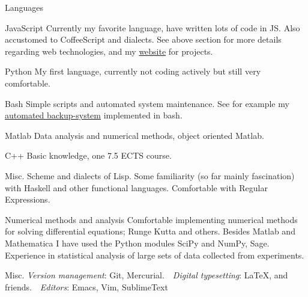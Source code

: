 \begin{myitemize}
  \item[Languages]
    \begin{list}{}{%
      \setlength{\leftmargin}{1.5em}
      \setlength{\itemsep}{0em}
      \setlength{\parskip}{0em}
      \setlength{\parsep}{0.25em}
    }
      \item[JavaScript] Currently my favorite language, have written lots of code
        in JS. Also accustomed to CoffeeScript and dialects. See above section for
        more details regarding web technologies, and my \href{http://viktorq.se}{website} for projects.
      \item[Python] My first language, currently not coding actively but still very comfortable.
      \item[Bash] Simple scripts and automated system maintenance. See for example my
        \href{https://github.com/ViktorQvarfordt/automated-incremental-backups}{automated backup-system}
        implemented in bash.
      \item[Matlab] Data analysis and numerical methods, object oriented Matlab.
      \item[C++] Basic knowledge, one 7.5 ECTS course.
      \item[Misc.] Scheme and dialects of Lisp. Some familiarity (so far mainly fascination) with
        Haskell and other functional languages. Comfortable with Regular Expressions.
    \end{list}

  \item[Numerical methods and analysis] Comfortable implementing numerical methods for solving
    differential equations; Runge Kutta and others. Besides Matlab and Mathematica I have used
    the Python modules SciPy and NumPy, Sage. Experience in statistical analysis of large
    sets of data collected from experiments.

  \item[Misc.]
    \emph{Version management}: Git, Mercurial. \,\,
    \emph{Digital typesetting}: \LaTeX, \XeTeX and friends. \,\,
    \emph{Editors}: Emacs, Vim, SublimeText
\end{myitemize}


